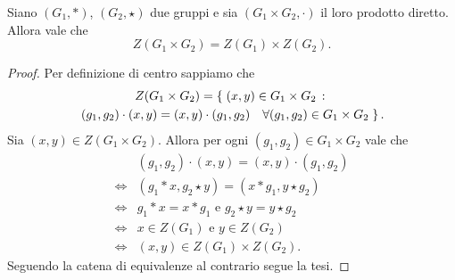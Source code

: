 \begin{proposition}
    Siano $(G_1, *)$, $(G_2, \star)$ due gruppi e sia $(G_1 \times G_2, \cdot)$ il loro prodotto diretto.
    Allora vale che \[
        Z(G_1 \times G_2) = Z(G_1) \times Z(G_2).
    \]
\end{proposition}
\begin{proof}
    Per definizione di centro sappiamo che \begin{multline*}
        Z(G_1 \times G_2) = \left\{\;(x, y) \in G_1 \times G_2 \,:\, \right. \\
        \left. (g_1, g_2) \cdot (x, y) = (x, y) \cdot (g_1, g_2) \quad \forall(g_1,g_2) \in G_1 \times G_2\;\right\}.  
    \end{multline*}
    Sia $(x, y) \in Z(G_1 \times G_2)$. Allora per ogni $ (g_1,g_2) \in G_1 \times G_2$ vale che \begin{align*}
        &(g_1, g_2) \cdot (x, y) = (x, y) \cdot (g_1, g_2) \\
        \iff &(g_1 * x, g_2 \star y) = (x * g_1, y \star g_2)\\
        \iff &g_1 * x = x*g_1 \text{ e } g_2 \star y = y \star g_2\\
        \iff &x \in Z(G_1) \text{ e } y \in Z(G_2)\\
        \iff &(x, y) \in Z(G_1) \times Z(G_2).
    \end{align*}
    Seguendo la catena di equivalenze al contrario segue la tesi.
\end{proof}

